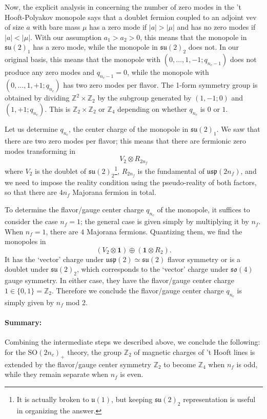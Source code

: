 \documentclass[12pt]{article}
\numberwithin{equation}{section}
\def\bZ{\mathbb{Z}}
\def\SO{\mathrm{SO}}
\def\u{\mathfrak{u}}
\def\su{\mathfrak{su}}
\def\so{\mathfrak{so}}
\def\usp{\mathfrak{usp}}
\begin{document}
Now, the explicit analysis in \cite[Sec.~IV]{Callias:1977kg} concerning the number of zero modes in the 't Hooft-Polyakov monopole says that 
a doublet fermion coupled to an adjoint vev of size $a$ with bare mass $\mu$ has
a zero mode if $|a|>|\mu|$ and 
has no zero modes if $|a|<|\mu|$.
With our assumption $a_1>a_2>0$, this means that the monopole in $\su(2)_1$ has a zero mode, while the monopole in $\su(2)_2$ does not.
In our original basis, this means that the monopole with $(0,\ldots,1,-1;q_{n_c-1})$ does not produce any zero modes and $q_{n_c-1}=0$,
while the monopole with $(0,\ldots,1,+1;q_{n_c})$  has two zero modes per flavor.
The 1-form symmetry group is obtained by dividing $\bZ^2\times \bZ_2$ by the subgroup generated by $(1,-1;0)$ and $(1,+1;q_{n_c})$.
This is $\bZ_2\times \bZ_2$ or $\bZ_4$ depending on whether $q_{n_c}$ is $0$ or $1$.

Let us determine $q_{n_c}$, the center charge of the monopole in $\su(2)_1$.
We saw that there are two zero modes per flavor; 
this means that there are fermionic zero modes transforming in \begin{equation}
V_{2} \otimes R_{2n_f} 
\end{equation} where $V_2$ is the doublet of $\su(2)_2$\footnote{
	It is actually broken to $\u(1)$, but keeping $\su(2)_2$ representation is useful in organizing the answer.
}, 
$R_{2n_f}$ is the fundamental of $\usp(2n_f)$,
and we need to impose the reality condition using the pseudo-reality of both factors,
so that there are $4n_f$ Majorana fermion in total.

To determine the flavor/gauge center charge $q_{n_c}$ of the monopole,
it suffices to consider the case $n_f=1$;
the general case is given simply by multiplying it by $n_f$.
When $n_f=1$, there are $4$ Majorana fermions.
Quantizing them, we find the monopoles in \begin{equation}
(V_2 \otimes \mathbf{1}) \oplus (\mathbf{1}\otimes R_2).
\end{equation}
It has the `vector' charge under $\usp(2)\simeq\su(2)$ flavor symmetry or is a doublet under $\su(2)_2$,
which corresponds to the `vector' charge under $\so(4)$ gauge symmetry.
In either case, they have the flavor/gauge center charge $1 \in \{0,1\}=\bZ_2$.
Therefore we conclude the flavor/gauge center charge $q_{n_c}$ is simply given by $n_f$ mod 2.

\paragraph{Summary:}
Combining the intermediate steps we described above, we conclude the following: 
for the $\SO(2n_c)_+$ theory,
the group $\bZ_2$ of magnetic charges of 't Hooft lines is extended by the flavor/gauge center symmetry $\bZ_2$ to become $\bZ_4$ when $n_f$ is odd,
while they remain separate when $n_f$ is even.
\end{document}
